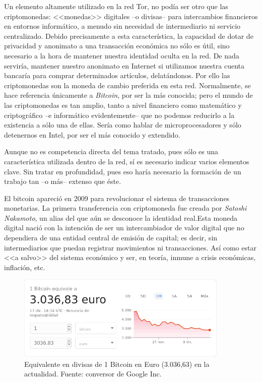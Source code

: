 \documentclass[a4paper, 11pt, titlepage]{article}
\begin{document}
        Un elemento altamente utilizado en la red Tor, no podía ser otro que las criptomonedas: <<monedas>> digitales --o 
        divisas-- para intercambios financieros en entornos informático, a menudo sin necesidad de intermediario ni servicio 
        centralizado. Debido precisamente a esta característica, la capacidad de dotar de privacidad y anonimato a una 
        transacción económica no sólo es útil, sino necesario a la hora de mantener nuestra identidad oculta en la red.
        De nada serviría, mantener nuestro anonimato en Internet si utilizamos nuestra cuenta bancaría para comprar 
        determinados artículos, delatándonos. Por ello las criptomonedas son la moneda de cambio preferida en esta red. 
        Normalmente, se hace referencia únicamente a \emph{Bitcoin}, por ser la más conocida; pero el mundo de las 
        criptomonedas es tan amplio, tanto a nivel financiero como matemático y criptográfico --e informático evidentemente-- 
        que no podemos reducirlo a la existencia a sólo una de ellas. Sería como hablar de microprocesadores y sólo detenernos 
        en Intel, por ser el más conocido y extendido.

        Aunque no es competencia directa del tema tratado, pues sólo es una característica utilizada dentro de la red, sí es 
        necesario indicar varios elementos clave. Sin tratar en profundidad, pues eso haría necesario la formación de un 
        trabajo tan --o más-- extenso que éste.
        
        El bitcoin apareció en 2009 para revolucionar el sistema de transacciones monetarias. La primera transferencia con 
        criptomoneda fue creada por \emph{Satoshi Nakamoto}, un alias del que aún se desconoce la identidad real.Esta moneda 
        digital nació con la intención de ser un intercambiador de valor digital que no dependiera de una entidad central 
        de emisión de capital; es decir, sin intermediarios que puedan registrar movimientos ni transacciones. Así como estar 
        <<a salvo>> del sistema económico y ser, en teoría, inmune a crisis económicas, inflación, etc. 
        
        \begin{figure}[htp]
            \centering
            \includegraphics[width=0.9\textwidth]{resources/criptomonedas00.png}
            \caption{Equivalente en divisas de 1 Bitcoin en Euro (3.036,63) en la actualidad. Fuente: conversor de Google Inc.}
            \label{}
        \end{figure}
        
\end{document}
